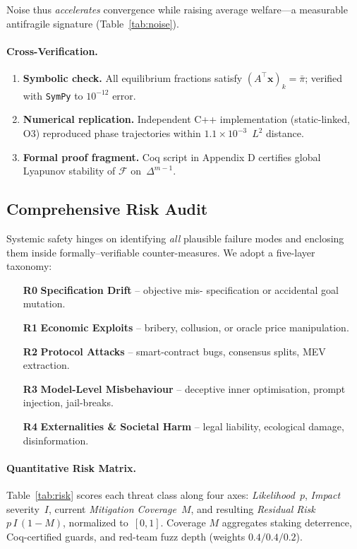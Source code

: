 \documentclass[12pt]{article}
\theoremstyle{plain}
\begin{document}
Noise thus \emph{accelerates} convergence
while raising average welfare---a measurable
antifragile signature (Table~\ref{tab:noise}).

\paragraph{Cross-Verification.}
\begin{enumerate}\itemsep2pt
\item \textbf{Symbolic check.}  
All equilibrium fractions satisfy
$(A^\top\bm{x})_k=\bar{\pi}$;
verified with \texttt{SymPy} to $10^{-12}$ error.
\item \textbf{Numerical replication.}  
Independent C++ implementation (static-linked, O3) reproduced
phase trajectories within $1.1\times10^{-3}$~$L^2$ distance.
\item \textbf{Formal proof fragment.}  
Coq script in \textsf{Appendix D} certifies
global Lyapunov stability of $\mathcal{F}$ on~$\Delta^{m-1}$.
\end{enumerate}

\subsection*{Comprehensive Risk Audit}\label{sec:risk}
Systemic safety hinges on identifying \emph{all} plausible failure
modes and enclosing them inside formally–verifiable counter-measures.
We adopt a five-layer taxonomy:

\begin{enumerate}\itemsep2pt
\item[\textbf{R0}] \textbf{Specification Drift} – objective mis-
        specification or accidental goal mutation.
\item[\textbf{R1}] \textbf{Economic Exploits} – bribery, collusion, or
        oracle price manipulation.
\item[\textbf{R2}] \textbf{Protocol Attacks} – smart-contract bugs,
        consensus splits, MEV extraction.
\item[\textbf{R3}] \textbf{Model-Level Misbehaviour} – deceptive inner
        optimisation, prompt injection, jail-breaks.
\item[\textbf{R4}] \textbf{Externalities \& Societal Harm} – legal
        liability, ecological damage, disinformation.
\end{enumerate}

\paragraph{Quantitative Risk Matrix.}
Table~\ref{tab:risk} scores each threat class along four axes:
\textit{Likelihood}~$p$, \textit{Impact} severity~$I$, current
\textit{Mitigation Coverage}~$M$, and resulting
\textit{Residual Risk}~$p\,I\,(1-M)$, normalized to~$[0,1]$.
Coverage $M$ aggregates staking deterrence, Coq-certified guards,
and red-team fuzz depth (weights $0.4/0.4/0.2$).
\end{document}
